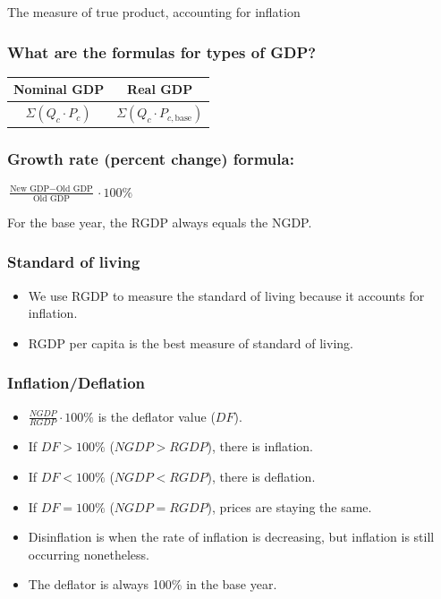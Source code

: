 \documentclass[
  letterpaper,
  DIV=11,
  numbers=noendperiod]{scrartcl}
\providecommand{\tightlist}{%
  \setlength{\itemsep}{0pt}\setlength{\parskip}{0pt}}\usepackage{longtable,booktabs,array}
\begin{document}
The measure of true product, accounting for inflation

\hypertarget{what-are-the-formulas-for-types-of-gdp}{%
\subsubsection{What are the formulas for types of
GDP?}\label{what-are-the-formulas-for-types-of-gdp}}

\begin{longtable}[]{@{}cc@{}}
\toprule\noalign{}
Nominal GDP & Real GDP \\
\midrule\noalign{}
\endhead
\bottomrule\noalign{}
\endlastfoot
\(\Sigma (Q_c \cdot P_c)\) & \(\Sigma (Q_c \cdot P_{c,\text{base}})\) \\
\end{longtable}

\hypertarget{growth-rate-percent-change-formula}{%
\subsubsection{Growth rate (percent change)
formula:}\label{growth-rate-percent-change-formula}}

\(\frac{\text{New GDP}-\text{Old GDP}}{\text{Old GDP}} \cdot 100\%\)

For the base year, the RGDP always equals the NGDP.

\hypertarget{standard-of-living}{%
\subsubsection{Standard of living}\label{standard-of-living}}

\begin{itemize}
\tightlist
\item
  We use RGDP to measure the standard of living because it accounts for
  inflation.
\item
  RGDP per capita is the best measure of standard of living.
\end{itemize}

\hypertarget{inflationdeflation}{%
\subsubsection{Inflation/Deflation}\label{inflationdeflation}}

\begin{itemize}
\tightlist
\item
  \(\frac{NGDP}{RGDP} \cdot 100\%\) is the deflator value (\(DF\)).
\item
  If \(DF > 100\%\) (\(NGDP > RGDP\)), there is inflation.
\item
  If \(DF < 100\%\) (\(NGDP < RGDP\)), there is deflation.
\item
  If \(DF = 100\%\) (\(NGDP = RGDP\)), prices are staying the same.
\item
  Disinflation is when the rate of inflation is decreasing, but
  inflation is still occurring nonetheless.
\item
  The deflator is always 100\% in the base year.
\end{itemize}
\end{document}

